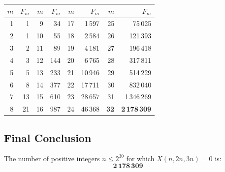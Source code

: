 ﻿\documentclass[a4paper]{article}
\begin{document}
\begin{center}
\begin{tabular}{rr||rr||rr||rr}
\toprule
$m$ & $F_m$ & $m$ & $F_m$ & $m$ & $F_m$ & $m$ & $F_m$ \\
\midrule
1 & 1 & 9 & 34 & 17 & 1\,597 & 25 & 75\,025 \\
2 & 1 & 10 & 55 & 18 & 2\,584 & 26 & 121\,393 \\
3 & 2 & 11 & 89 & 19 & 4\,181 & 27 & 196\,418 \\
4 & 3 & 12 & 144 & 20 & 6\,765 & 28 & 317\,811 \\
5 & 5 & 13 & 233 & 21 & 10\,946 & 29 & 514\,229 \\
6 & 8 & 14 & 377 & 22 & 17\,711 & 30 & 832\,040 \\
7 & 13 & 15 & 610 & 23 & 28\,657 & 31 & 1\,346\,269 \\
8 & 21 & 16 & 987 & 24 & 46\,368 & \textbf{32} & \textbf{2\,178\,309} \\
\bottomrule
\end{tabular}
\end{center}

\subsection{Final Conclusion}
The number of positive integers $n \le 2^{30}$ for which $X(n, 2n, 3n) = 0$ is:
\begin{equation*}
\boxed{\mathbf{2\,178\,309}}
\end{equation*}
\end{document}

